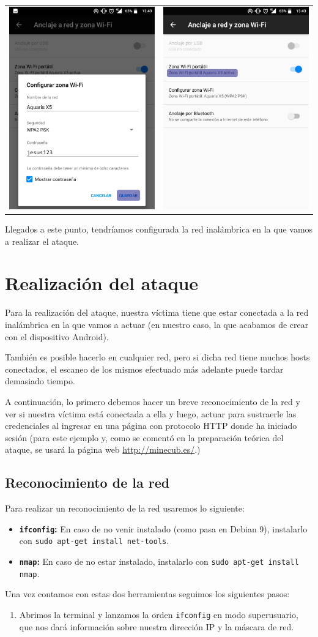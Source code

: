 \begin{enumerate}
\begin{center}
\begin{tabular}{ c c }
			\includegraphics[scale=0.25]{5v2.png} & \includegraphics[scale=0.25]{6v2.png} 
		\end{tabular}		
	\end{center}
\end{enumerate}

Llegados a este punto, tendríamos configurada la red inalámbrica en la que vamos a realizar el ataque.

\section{Realización del ataque}
Para la realización del ataque, nuestra víctima tiene que estar conectada a la red inalámbrica en la que vamos a actuar (en nuestro caso, la que acabamos de crear con el dispositivo Android).

\Nota También es posible hacerlo en cualquier red, pero si dicha red tiene muchos hosts conectados, el escaneo de los mismos efectuado más adelante puede tardar demasiado tiempo.

A continuación, lo primero debemos hacer un breve reconocimiento de la red y ver si nuestra víctima está conectada a ella y luego, actuar para sustraerle las credenciales al ingresar en una página con protocolo HTTP donde ha iniciado sesión (para este ejemplo y, como se comentó en la preparación teórica del ataque, se usará la página web \url{http://minecub.es/}.)

\subsection{Reconocimiento de la red}
Para realizar un reconocimiento de la red usaremos lo siguiente:
\begin{itemize}
	\item \textbf{\texttt{ifconfig}:} En caso de no venir instalado (como pasa en Debian 9), instalarlo con \texttt{sudo apt-get install net-tools}.
	\item \textbf{\texttt{nmap}:} En caso de no estar instalado, instalarlo con \texttt{sudo apt-get install nmap}.
\end{itemize}

Una vez contamos con estas dos herramientas seguimos los siguientes pasos:
\begin{enumerate}
	\item Abrimos la terminal y lanzamos la orden \texttt{ifconfig} en modo superusuario, que nos dará información sobre nuestra dirección IP y la máscara de red.
	\begin{center}
	
\end{center}
\end{enumerate}
